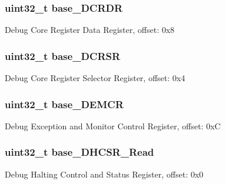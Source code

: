 \subsubsection[{base\+\_\+\+D\+C\+R\+D\+R}]{\setlength{\rightskip}{0pt plus 5cm}uint32\+\_\+t base\+\_\+\+D\+C\+R\+D\+R}\label{struct_core_debug___mem_map_a24117c992f237c14f50718450adf91be}
Debug Core Register Data Register, offset\+: 0x8 \hypertarget{struct_core_debug___mem_map_a982469115dfee452a1011a5ca1258911}{}
\subsubsection[{base\+\_\+\+D\+C\+R\+S\+R}]{\setlength{\rightskip}{0pt plus 5cm}uint32\+\_\+t base\+\_\+\+D\+C\+R\+S\+R}\label{struct_core_debug___mem_map_a982469115dfee452a1011a5ca1258911}
Debug Core Register Selector Register, offset\+: 0x4 \hypertarget{struct_core_debug___mem_map_a61a7cec8c03ae8b9fd1c90193ebe1f9f}{}
\subsubsection[{base\+\_\+\+D\+E\+M\+C\+R}]{\setlength{\rightskip}{0pt plus 5cm}uint32\+\_\+t base\+\_\+\+D\+E\+M\+C\+R}\label{struct_core_debug___mem_map_a61a7cec8c03ae8b9fd1c90193ebe1f9f}
Debug Exception and Monitor Control Register, offset\+: 0x\+C \hypertarget{struct_core_debug___mem_map_af7ac245a8dc5badd325e2a79d5e926b5}{}
\subsubsection[{base\+\_\+\+D\+H\+C\+S\+R\+\_\+\+Read}]{\setlength{\rightskip}{0pt plus 5cm}uint32\+\_\+t base\+\_\+\+D\+H\+C\+S\+R\+\_\+\+Read}\label{struct_core_debug___mem_map_af7ac245a8dc5badd325e2a79d5e926b5}
Debug Halting Control and Status Register, offset\+: 0x0 \hypertarget{struct_core_debug___mem_map_a033962700f14389a6ecb3282097e4308}{}
